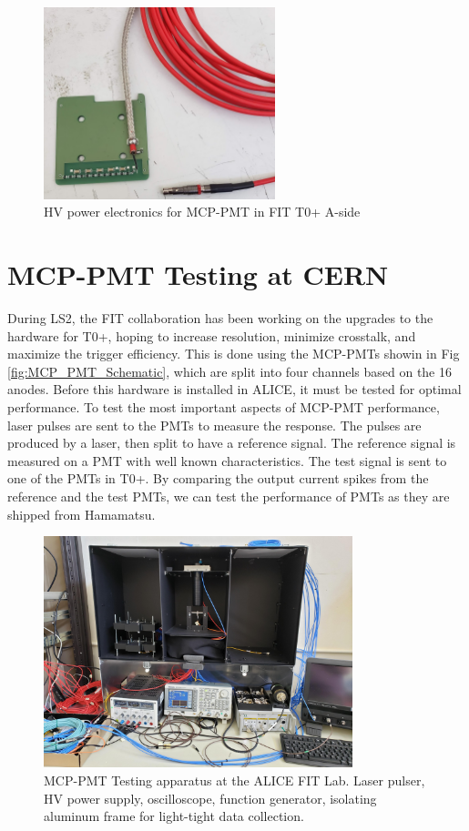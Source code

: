 \begin{figure}[H]
    \centering
    \includegraphics[width=0.6\textwidth]{figures/FIT/power_board.jpg}
    \caption{HV power electronics for MCP-PMT in FIT T0+ A-side}
    \label{fig:power_board}
\end{figure}

\section{MCP-PMT Testing at CERN}\label{pmt_testing}
During LS2, the FIT collaboration has been working on the upgrades to the hardware for T0+, hoping to increase resolution, minimize crosstalk, and maximize the trigger efficiency. This is done using the MCP-PMTs showin in Fig \ref{fig:MCP_PMT_Schematic}, which are split into four channels based on the 16 anodes. Before this hardware is installed in ALICE, it must be tested for optimal performance. To test the most important aspects of MCP-PMT performance, laser pulses are sent to the PMTs to measure the response. The pulses are produced by a laser, then split to have a reference signal. The reference signal is measured on a PMT with well known characteristics. The test signal is sent to one of the PMTs in T0+. By comparing the output current spikes from the reference and the test PMTs, we can test the performance of PMTs as they are shipped from Hamamatsu. 


\begin{figure}[H]
    \centering
    \includegraphics[width=0.8\textwidth]{figures/FIT/PMT_Test_apparatus.jpg}
    \caption{MCP-PMT Testing apparatus at the ALICE FIT Lab. Laser pulser, HV power supply, oscilloscope, function generator, isolating aluminum frame for light-tight data collection.}
    \label{fig:PMT_Testing_Apparatus}
\end{figure}

